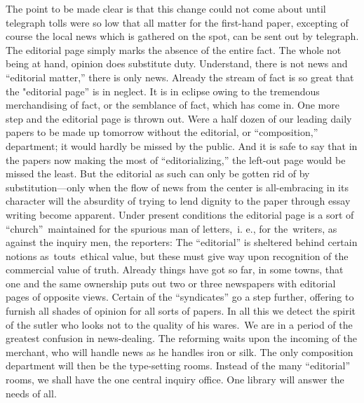 \documentclass[twoside,symmetric,nobib,justified]{tufte-book}
\begin{document}
The point to be made clear is that this change could not come about
until telegraph tolls were so low that all matter for the first-hand
paper, excepting of course the local news which is gathered on the spot,
can be sent out by telegraph. The editorial page simply marks the
absence of the entire fact. The whole not being at hand, opinion does
substitute duty. Understand, there is not news and ``editorial matter,''
there is only news. Already the stream of fact is so great that the
"editorial page'' is in neglect. It is in eclipse owing to the
tremendous merchandising of fact, or the semblance of fact, which has
come in. One more step and the editorial page is thrown out. Were a half
dozen of our leading daily papers to be made up tomorrow without the
editorial, or ``composition,'' department; it would hardly be missed by
the public. And it is safe to say that in the papers now making the most
of ``editorializing,'' the left-out page would be missed the least. But
the editorial as such can only be gotten rid of by substitution---only
when the flow of news from the center is all-embracing in its character
will the absurdity of trying to lend dignity to the paper through essay
writing become apparent. Under present conditions the editorial page is
a sort of ``church''~maintained for the spurious man of letters,~i. e.,
for the~writers, as against the inquiry men, the reporters: The
``editorial'' is sheltered behind certain notions as~touts~ethical
value, but these must give way upon recognition of the commercial value
of truth. Already things have got so far, in some towns, that one and
the same ownership puts out two or three newspapers with editorial pages
of opposite views. Certain of the ``syndicates'' go a step further,
offering to furnish all shades of opinion for all sorts of papers. In
all this we detect the spirit of the sutler who looks not to the quality
of his wares.~We are in a period of the greatest confusion in
news-dealing. The reforming waits upon the incoming of the merchant, who
will handle news as he handles iron or silk. The only composition
department will then be the type-setting rooms. Instead of the many
``editorial'' rooms, we shall have the one central inquiry office. One
library will answer the needs of all.~
\end{document}
